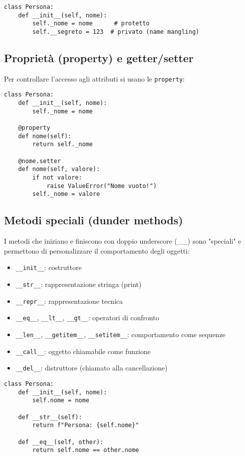 \documentclass[a4paper,12pt]{article}
\begin{document}
\begin{lstlisting}
class Persona:
    def __init__(self, nome):
        self._nome = nome      # protetto
        self.__segreto = 123  # privato (name mangling)
\end{lstlisting}

\subsection*{Proprietà (property) e getter/setter}
Per controllare l'accesso agli attributi si usano le \texttt{property}:

\begin{lstlisting}
class Persona:
    def __init__(self, nome):
        self._nome = nome

    @property
    def nome(self):
        return self._nome

    @nome.setter
    def nome(self, valore):
        if not valore:
            raise ValueError("Nome vuoto!")
        self._nome = valore
\end{lstlisting}

\subsection*{Metodi speciali (dunder methods)}
I metodi che iniziano e finiscono con doppio underscore (\_\_) sono "speciali" e permettono di personalizzare il comportamento degli oggetti:

\begin{itemize}
    \item \texttt{\_\_init\_\_}: costruttore
    \item \texttt{\_\_str\_\_}: rappresentazione stringa (print)
    \item \texttt{\_\_repr\_\_}: rappresentazione tecnica
    \item \texttt{\_\_eq\_\_}, \texttt{\_\_lt\_\_}, \texttt{\_\_gt\_\_}: operatori di confronto
    \item \texttt{\_\_len\_\_}, \texttt{\_\_getitem\_\_}, \texttt{\_\_setitem\_\_}: comportamento come sequenze
    \item \texttt{\_\_call\_\_}: oggetto chiamabile come funzione
    \item \texttt{\_\_del\_\_}: distruttore (chiamato alla cancellazione)
\end{itemize}

\begin{lstlisting}
class Persona:
    def __init__(self, nome):
        self.nome = nome

    def __str__(self):
        return f"Persona: {self.nome}"

    def __eq__(self, other):
        return self.nome == other.nome
\end{lstlisting}
\end{document}
